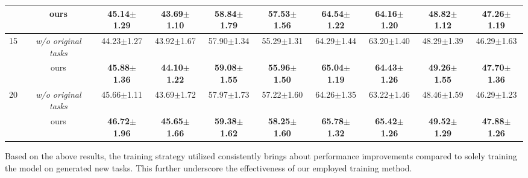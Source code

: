 \begin{table*}[ht]
{\begin{tabular}{@{}c|c|cccccccc@{}}
                      & ours                   & \textbf{45.14$\pm$1.29}          & \textbf{43.69$\pm$1.10}         & \textbf{58.84$\pm$1.79}          & \textbf{57.53$\pm$1.56}         & \textbf{64.54$\pm$1.22}         & \textbf{64.16$\pm$1.20}         & \textbf{48.82$\pm$1.12}         & \textbf{47.26$\pm$1.19}         \\ \midrule
\multirow{2}{*}{15}   & \textit{w/o original tasks}                 & 44.23$\pm$1.27                   & 43.92$\pm$1.67                  & 57.90$\pm$1.34                   & 55.29$\pm$1.31                  & 64.29$\pm$1.44                  & 63.20$\pm$1.40                  & 48.29$\pm$1.39                  & 46.29$\pm$1.63                  \\
                      & ours                   & \textbf{45.88$\pm$1.36}          & \textbf{44.10$\pm$1.22}         & \textbf{59.08$\pm$1.55}          & \textbf{55.96$\pm$1.50}         & \textbf{65.04$\pm$1.19}         & \textbf{64.43$\pm$1.26}         & \textbf{49.26$\pm$1.55}         & \textbf{47.70$\pm$1.36}         \\ \midrule
\multirow{2}{*}{20}   & \textit{w/o original tasks}                 & 45.66$\pm$1.11                   & 43.69$\pm$1.72                  & 57.97$\pm$1.73                   & 57.22$\pm$1.60                  & 64.26$\pm$1.35                  & 63.22$\pm$1.46                  & 48.46$\pm$1.59                  & 46.29$\pm$1.23                  \\
                      & ours                   & \textbf{46.72$\pm$1.96}          & \textbf{45.65$\pm$1.66}         & \textbf{59.38$\pm$1.62}          & \textbf{58.25$\pm$1.60}         & \textbf{65.78$\pm$1.32}         & \textbf{65.42$\pm$1.26}         & \textbf{49.52$\pm$1.29}         & \textbf{47.88$\pm$1.26}         \\ \bottomrule
\end{tabular}%
}
\end{table*}
Based on the above results, the training strategy utilized consistently brings about performance improvements compared to solely training the model on generated new tasks. This further underscore the effectiveness of our employed training method.

